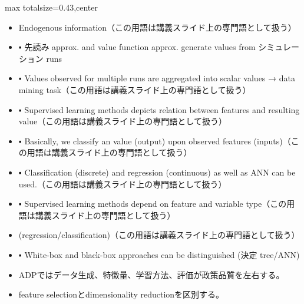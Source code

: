 \clearpage
{}
\begin{minipage}[t]{0.405\textwidth}
\begin{adjustbox}{max totalsize={\textwidth}{0.43\textheight},center}
\begin{minipage}{\textwidth}\scriptsize
{}\begin{itemize}
\item Endogenous information（この用語は講義スライド上の専門語として扱う）
\item ▪ 先読み approx. and value function approx. generate values from シミュレーション runs
\item ▪ Values observed for multiple runs are aggregated into scalar values → data mining task（この用語は講義スライド上の専門語として扱う）
\item ▪ Supervised learning methods depicts relation between features and resulting value（この用語は講義スライド上の専門語として扱う）
\item ▪ Basically, we classify an value (output) upon observed features (inputs)（この用語は講義スライド上の専門語として扱う）
\item ▪ Classification (discrete) and regression (continuous) as well as ANN can be used.（この用語は講義スライド上の専門語として扱う）
\item ▪ Supervised learning methods depend on feature and variable type（この用語は講義スライド上の専門語として扱う）
\item (regression/classification)（この用語は講義スライド上の専門語として扱う）
\item ▪ White-box and black-box approaches can be distinguished (決定 tree/ANN)
\end{itemize}\begin{itemize}
\item ADPではデータ生成、特徴量、学習方法、評価が政策品質を左右する。
\item feature selectionとdimensionality reductionを区別する。
\end{itemize}
\end{minipage}
\end{adjustbox}
\end{minipage}\hfill
